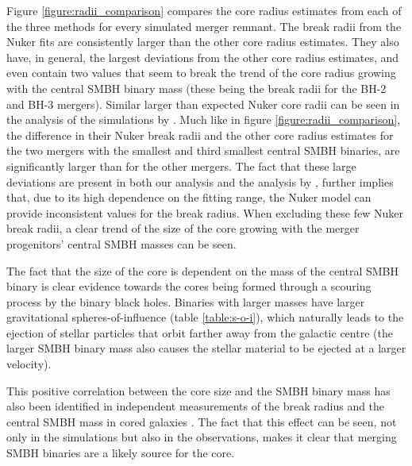 \documentclass[english, oneside]{HYgradu}
\begin{document}
Figure \ref{figure:radii_comparison} compares the core radius estimates from each of the three methods for every simulated merger remnant. The break radii from the Nuker fits are consistently larger than the other core radius estimates. They also have, in general, the largest deviations from the other core radius estimates, and even contain two values that seem to break the trend of the core radius growing with the central SMBH binary mass (these being the break radii for the BH-2 and BH-3 mergers). Similar larger than expected Nuker core radii can be seen in the analysis of the simulations by \cite{Rantala2018}. Much like in figure \ref{figure:radii_comparison}, the difference in their Nuker break radii and the other core radius estimates for the two mergers with the smallest and third smallest central SMBH binaries, are significantly larger than for the other mergers. The fact that these large deviations are present in both our analysis and the analysis by \cite{Rantala2018}, further implies that, due to its high dependence on the fitting range, the Nuker model can provide inconsistent values for the break radius. When excluding these few Nuker break radii, a clear trend of the size of the core growing with the merger progenitors' central SMBH masses can be seen.

The fact that the size of the core is dependent on the mass of the central SMBH binary is clear evidence towards the cores being formed through a scouring process by the binary black holes. Binaries with larger masses have larger gravitational spheres-of-influence (table \ref{table:s-o-i}), which naturally leads to the ejection of stellar particles that orbit farther away from the galactic centre (the larger SMBH binary mass also causes the stellar material to be ejected at a larger velocity). 

This positive correlation between the core size and the SMBH binary mass has also been identified in independent measurements of the break radius and the central SMBH mass in cored galaxies \citep[e.g.][]{deRuiter2005, Lauer2007Cusp, Thomas2016}. The fact that this effect can be seen, not only in the simulations but also in the observations, makes it clear that merging SMBH binaries are a likely source for the core.
\end{document}
